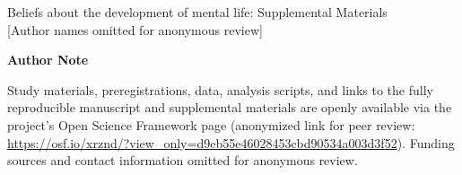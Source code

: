\begin{titlepage}
    \begin{center}
        \vspace*{1in}
        {\Large Beliefs about the development of mental life: Supplemental Materials} \\[2cm]
        
                [Author names omitted for anonymous review]
    
    \end{center}
    \vfill
    \textbf{Author Note} \\
    \setlength{\parindent}{2em}
    
    \indent Study materials, preregistrations, data, analysis scripts, and links to the fully reproducible manuscript and supplemental materials are openly available via the project’s Open Science Framework page (anonymized link for peer review: \url{https://osf.io/xrznd/?view_only=d9eb55e46028453cbd90534a003d3f52}). Funding sources and contact information omitted for anonymous review.

\end{titlepage}
